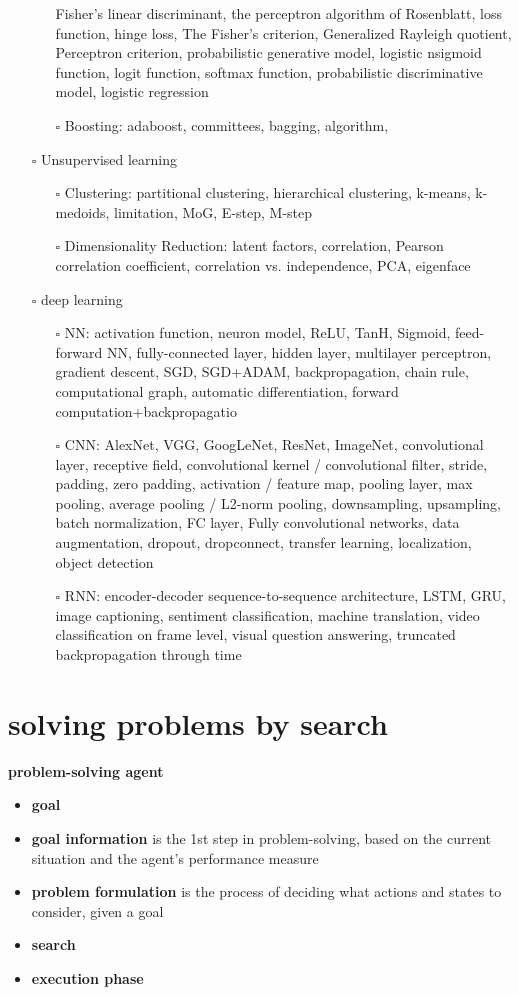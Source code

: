 \documentclass[11pt]{article}
\begin{document}
\begin{itemize}
\begin{itemize}
Fisher’s linear discriminant, the perceptron algorithm of Rosenblatt, loss
function, hinge loss, The Fisher’s criterion, Generalized Rayleigh
quotient, Perceptron criterion, probabilistic generative model, logistic
nsigmoid function, logit function, softmax function, probabilistic
discriminative model, logistic regression
\item[{$\square$}] Boosting: adaboost, committees, bagging, algorithm,
\end{itemize}
\item[{$\square$}] Unsupervised learning
\begin{itemize}
\item[{$\square$}] Clustering: partitional clustering, hierarchical clustering, k-means,
k-medoids, limitation, MoG, E-step, M-step
\item[{$\square$}] Dimensionality Reduction: latent factors, correlation, Pearson
correlation coefficient, correlation vs. independence, PCA, eigenface
\end{itemize}
\item[{$\square$}] deep learning
\begin{itemize}
\item[{$\square$}] NN: activation function, neuron model, ReLU, TanH, Sigmoid,
feed-forward NN, fully-connected layer, hidden layer, multilayer
perceptron, gradient descent, SGD, SGD+ADAM, backpropagation, chain rule,
computational graph, automatic differentiation, forward
computation+backpropagatio
\item[{$\square$}] CNN: AlexNet, VGG, GoogLeNet, ResNet, ImageNet, convolutional layer,
receptive field, convolutional kernel / convolutional filter, stride,
padding, zero padding, activation / feature map, pooling layer, max
pooling, average pooling / L2-norm pooling, downsampling, upsampling,
batch normalization, FC layer, Fully convolutional networks, data
augmentation, dropout, dropconnect, transfer learning, localization,
object detection
\item[{$\square$}] RNN: encoder-decoder sequence-to-sequence architecture, LSTM, GRU,
image captioning, sentiment classification, machine translation, video
classification on frame level, visual question answering, truncated
backpropagation through time
\end{itemize}
\end{itemize}
\section{solving problems by search}
\label{sec:orgeee148d}
\textbf{problem-solving agent}
\begin{itemize}
\item \textbf{goal}
\item \textbf{goal information} is the 1st step in problem-solving, based on the
current situation and the agent’s performance measure
\item \textbf{problem formulation} is the process of deciding what actions and
states to consider, given a goal
\item \textbf{search}
\item \textbf{execution phase}
\end{itemize}
\end{document}
